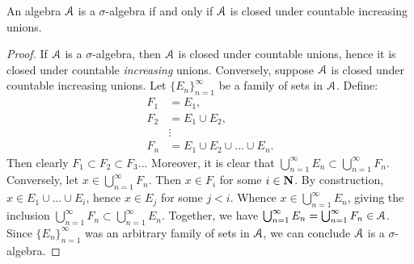 \documentclass[10pt,twoside,openany]{memoir}
\begin{document}
\begin{exercise}
    An algebra $\mathcal{A}$ is a $\sigma$-algebra if and only if $\mathcal{A}$ is closed under countable increasing unions.
\end{exercise}
    {\color{blue} \begin{proof}
        If $\mathcal{A}$ is a $\sigma$-algebra, then $\mathcal{A}$ is closed under countable unions, hence it is closed under countable \textit{increasing} unions. Conversely, suppose $\mathcal{A}$ is closed under countable increasing unions. Let $\{E_n\}_{n = 1}^\infty$ be a family of sets in $\mathcal{A}$. Define:
            \begin{equation*}
            \begin{split}
                F_1 &= E_1, \\
                F_2 &= E_1 \cup E_2, \\
                &\vdots \\
                F_n &= E_1 \cup E_2 \cup ... \cup E_n.
            \end{split}
            \end{equation*}
        Then clearly $F_1 \subset F_2 \subset F_3 ...$ Moreover, it is clear that $\bigcup_{n = 1}^\infty E_n \subset \bigcup_{n = 1}^\infty F_n$. Conversely, let $x \in \bigcup_{n = 1}^\infty F_n$. Then $x \in F_i$ for some $i \in \mathbf{N}$. By construction, $x \in E_1 \cup ... \cup E_i$, hence $x \in E_j$ for some $j < i$. Whence $x \in \bigcup_{n=1}^\infty E_n$, giving the inclusion $\bigcup_{n = 1}^\infty F_n \subset \bigcup_{n = 1}^\infty E_n$. Together, we have  $\bigcup_{n = 1}^\infty E_n = \bigcup_{n = 1}^\infty F_n \in \mathcal{A}$. Since $\{E_n\}_{n = 1}^\infty$ was an arbitrary family of sets in $\mathcal{A}$, we can conclude $\mathcal{A}$ is a $\sigma$-algebra.
    \end{proof}}
\end{document}
